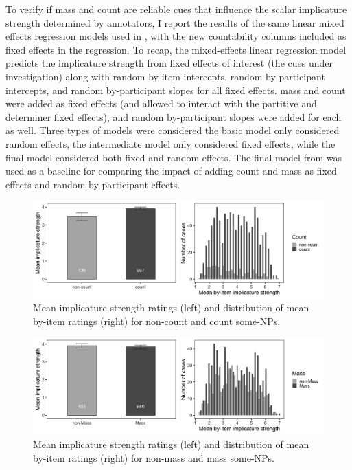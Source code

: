 \documentclass[10pt, biblatex, linguex]{report}
\begin{document}
To verify if {\rmsc mass} and {\rmsc count} are reliable cues that influence the
scalar implicature strength determined by annotators, I report the results of
the same linear mixed effects regression models \citep{baayen2008mixed} used in
\citet{degen_investigating_2015}, with the new countability columns included as
fixed effects in the regression. To recap, the mixed-effects linear regression
model predicts the implicature strength from fixed effects of interest (the cues
under investigation) along with random by-item intercepts, random by-participant
intercepts, and random by-participant slopes for all fixed effects. {\rmsc mass}
and {\rmsc count} were added as fixed effects (and allowed to interact with the
{\rmsc partitive} and {\rmsc determiner} fixed effects), and random by-participant
slopes were added for each as well. Three types of models were considered \dash
the basic model only considered random effects, the intermediate model only
considered fixed effects, while the final model considered both fixed and
random effects. The final model from \citet{degen_investigating_2015} was used
as a baseline for comparing the impact of adding {\rmsc count} and {\rmsc mass}
as fixed effects and random by-participant effects.

\begin{figure}[t]
    \centering
    \includegraphics[width=\linewidth]{images/count.png}
    \caption{Mean implicature strength ratings (left) and distribution of mean
             by-item ratings (right) for non-count and count some-NPs.}
    \label{fig:count}
\end{figure}

\begin{figure}[t]
    \centering
    \includegraphics[width=\linewidth]{images/mass.png}
    \caption{Mean implicature strength ratings (left) and distribution of mean
             by-item ratings (right) for non-mass and mass some-NPs.}
    \label{fig:mass}
\end{figure}
\end{document}
